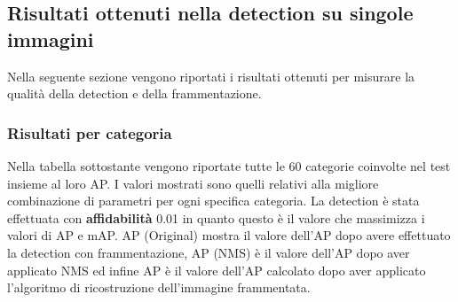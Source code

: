 \subsection{Risultati ottenuti nella detection su singole immagini}
Nella seguente sezione vengono riportati i risultati ottenuti per misurare la qualità della detection e della frammentazione.
\subsubsection{Risultati per categoria}
Nella tabella sottostante vengono riportate tutte le 60 categorie coinvolte nel test insieme al loro AP. I valori mostrati sono quelli relativi alla migliore combinazione di parametri per ogni specifica categoria. La detection è stata effettuata con \textbf{affidabilità} 0.01 in quanto questo è il valore che massimizza i valori di AP e mAP. AP (Original) mostra il valore dell'AP dopo avere effettuato la detection con frammentazione, AP (NMS) è il valore dell'AP dopo aver applicato NMS ed infine AP è il valore dell'AP calcolato dopo aver applicato l'algoritmo di ricostruzione dell'immagine frammentata.

